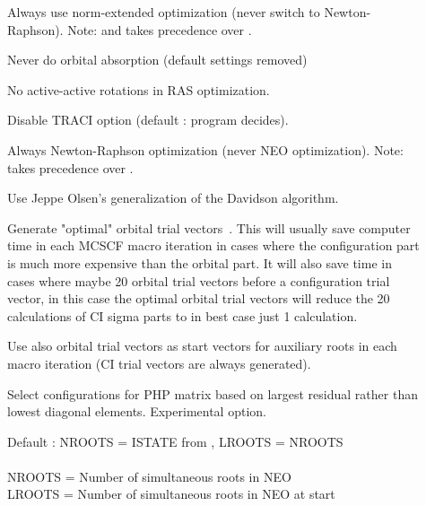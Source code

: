\begin{description}
\item[]
  Always use norm-extended optimization (never switch to New\-ton-Raph\-son).
  Note:  and 
  takes precedence over .

\item[]
  Never do orbital absorption (default settings removed)

\item[]
  No active-active rotations in RAS optimization.

\item[]
  Disable TRACI option (default : program decides).

\item[]
  Always Newton-Raphson optimization (never NEO optimization).
  Note:  takes precedence over
  .

\item[]
  Use Jeppe Olsen's generalization of the Davidson
  algorithm.

\item[]
  Generate "optimal" orbital trial
  vectors~\cite{hjajpjhajcp87}. 
  This will usually save computer time in each MCSCF macro iteration in cases
  where the configuration part is much more expensive than the orbital part.
  It will also save time in cases where maybe 20 orbital trial vectors
  before a configuration trial vector, in this case the optimal
  orbital trial vectors will reduce the 20 calculations of CI sigma
  parts to in best case just 1 calculation.

\item[]
  Use also orbital trial vectors as start vectors for auxiliary roots
  in each macro iteration (CI trial vectors are always generated).

\item[]
  Select configurations for PHP matrix based on largest residual
  rather than lowest diagonal elements. Experimental option.

\item[]
  Default : NROOTS = ISTATE from , LROOTS = NROOTS\\
   \\
  NROOTS = Number of simultaneous roots in NEO\\
  LROOTS = Number of simultaneous roots in NEO at start


\end{description}
